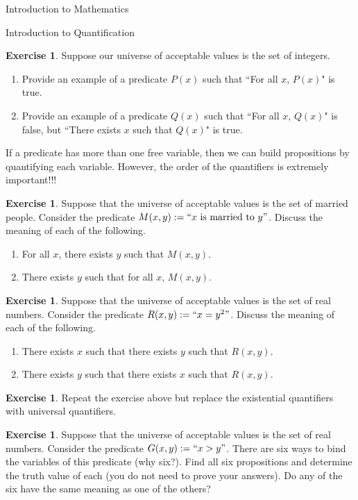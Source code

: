\documentclass[11pt]{article}
\theoremstyle{definition}
\newtheorem{exercise}[theorem]{Exercise}
\begin{document}
\begin{section}{Introduction to Mathematics}
\begin{subsection}{Introduction to Quantification}
\begin{exercise}
Suppose our universe of acceptable values is the set of integers.
\begin{enumerate}
\item Provide an example of a predicate $P(x)$ such that ``For all $x$, $P(x)$" is true.
\item Provide an example of a predicate $Q(x)$ such that ``For all $x$, $Q(x)$" is false, but ``There exists $x$ such that $Q(x)$" is true.
\end{enumerate}
\end{exercise}

If a predicate has more than one free variable, then we can build propositions by quantifying each variable.  However, the order of the quantifiers is extremely important!!!

\begin{exercise}
Suppose that the universe of acceptable values is the set of married people.  Consider the predicate $M(x,y):=``x\mbox{ is married to }y"$.  Discuss the meaning of each of the following.
\begin{enumerate}
\item For all $x$, there exists $y$ such that $M(x,y)$.
\item There exists $y$ such that for all $x$, $M(x,y)$.
\end{enumerate}
\end{exercise}

\begin{exercise}
Suppose that the universe of acceptable values is the set of real numbers.  Consider the predicate $R(x,y):=``x=y^2"$.  Discuss the meaning of each of the following.
\begin{enumerate}
\item There exists $x$ such that there exists $y$ such that $R(x,y)$.
\item There exists $y$ such that there exists $x$ such that $R(x,y)$.
\end{enumerate}
\end{exercise}

\begin{exercise}
Repeat the exercise above but replace the existential quantifiers with universal quantifiers.
\end{exercise}

\begin{exercise}
Suppose that the universe of acceptable values is the set of real numbers.  Consider the predicate $G(x,y):=``x>y"$.  There are six ways to bind the variables of this predicate (why six?).  Find all six propositions and determine the truth value of each (you do not need to prove your answers).  Do any of the six have the same meaning as one of the others?
\end{exercise}

\end{subsection}

\end{section}
\end{document}
